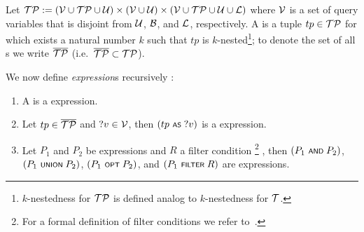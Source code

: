 	Let $\mathcal{TP} := (\mathcal{V} \cup \mathcal{TP} \cup \mathcal{U}) \times (\mathcal{V} \cup \mathcal{U}) \times (\mathcal{V} \cup \mathcal{TP} \cup \mathcal{U} \cup \mathcal{L})$ where $\mathcal{V}$ is a set of query variables that is disjoint from $\mathcal{U}$, $\mathcal{B}$, and $\mathcal{L}$, respectively.
A \emph{\TPplus} is a tuple $tp \in \mathcal{TP}$ for which exists a natural number $k$ such that $tp$ is $k$-nested\footnote{$k$-nestedness for $\mathcal{TP}$ is defined analog to $k$-nestedness for $\mathcal{T}$.}; to denote the set of all {\TPplus}s we write $\overline{\mathcal{TP}}$ (i.e.~$\overline{\mathcal{TP}} \subset \mathcal{TP}$).

	We now define \emph{{\SPARQLplus} expression}s recursively :
\begin{enumerate}
	\item A \emph{\TPplus} is a {\SPARQLplus} expression.
	\item Let $tp \in \overline{\mathcal{TP}}$ and $?v \in \mathcal{V}$, then $(tp \text{ \normalfont\scriptsize\textsf{AS} } ?v)$ is a {\SPARQLplus} expression.
	\item Let $P_1$ and $P_2$ be {\SPARQLplus} expressions and $R$ a filter condition%
		\footnote{For a formal definition of
		filter conditions we refer to~\cite{Perez09:SemanticsAndComplexityOfSPARQL}.}%
	, then $(P_1 \text{ \normalfont\scriptsize\textsf{AND} } P_2)$, $(P_1 \text{ \normalfont\scriptsize\textsf{UNION} } P_2)$, $(P_1 \text{ \normalfont\scriptsize\textsf{OPT} } P_2)$, and $(P_1 \text{ \normalfont\scriptsize\textsf{FILTER} } R)$ are {\SPARQLplus} expressions.
\end{enumerate}

